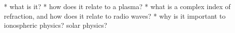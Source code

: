 
* what is it?
* how does it relate to a plasma?
* what is a complex index of refraction, and how does it relate to radio
waves?
* why is it important to ionospheric physics? solar physics?
